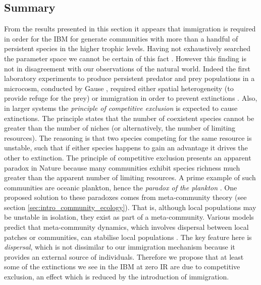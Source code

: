 \subsection{Summary}
\label{sec:disucss_persitence}

From the results presented in this section it appears that immigration is required in order for the IBM for generate communities with more than a handful of persistent species in the higher trophic levels. Having not exhaustively searched the parameter space we cannot be certain of this fact . However this finding is not in disagreement with our observations of the natural world. Indeed the first laboratory experiments to produce persistent predator and prey populations in a microcosm, conducted by Gause \cite{gause1934experimental}, required either spatial heterogeneity (to provide refuge for the prey) or immigration in order to prevent extinctions \cite{desharnais2005population}. Also, in larger systems the \emph{principle of competitive exclusion} is expected to cause extinctions. The principle states that the number of coexistent species cannot be greater than the number of niches (or alternatively, the number of limiting resources). The reasoning is that two species competing for the same resource is unstable, such that if either species happens to gain an advantage it drives the other to extinction. The principle of competitive exclusion presents an apparent paradox in Nature because many communities exhibit species richness much greater than the apparent number of limiting resources. A prime example of such communities are oceanic plankton, hence the \emph{paradox of the plankton} \cite{hutchinson1961paradox}. One proposed solution to these paradoxes comes from meta-community theory (see section \ref{sec:intro_community_ecology}). That is, although local populations may be unstable in isolation, they exist as part of a meta-community. Various models predict that meta-community dynamics, which involves dispersal between local patches or communities, can stabilise local populations \cite{holyoak1996persistence}. The key feature here is \emph{dispersal}, which is not dissimilar to our immigration mechanism because it provides an external source of individuals. Therefore we propose that at least some of the extinctions we see in the IBM at zero IR are due to competitive exclusion, an effect which is reduced by the introduction of immigration. 

